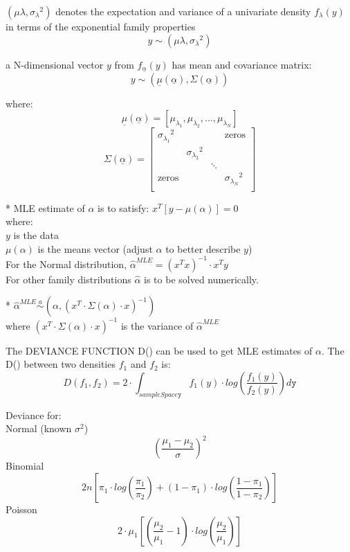 \documentclass[10pt,landscape]{article}
\begin{document}
\begin{multicols}{3}
$(\mu \lambda, {\sigma_\lambda}^2)$ denotes the expectation and variance of a univariate density $f_\lambda (y)$ in terms of the exponential family properties $$ y \sim (\mu \lambda, {\sigma_\lambda}^2) $$

\medskip
a N-dimensional vector $y$ from $f_{\underline{\alpha}} (y)$ has mean and covariance matrix: $$ y \sim (\underline{\mu} (\underline{\alpha}), \Sigma (\underline{\alpha})) $$

where:
$$ \underline{\mu} (\underline{\alpha}) = [\mu_{\lambda_1}, \mu_{\lambda_2}, \hdots, \mu_{\lambda_N}] $$
$$ \Sigma (\underline{\alpha}) = \begin{bmatrix}
 {\sigma_{\lambda_1}}^2 &  &  & \text{zeros} \\
   & {\sigma_{\lambda_2}}^2 &  &  \\
   &  & \ddots &  \\
 \text{zeros} &  &  & {\sigma_{\lambda_N}}^2 \\
\end{bmatrix} $$

\medskip
* MLE estimate of $\alpha$ is to satisfy: $x^T [y - \mu (\alpha)] = 0$ \\
where: \\
$y$ is the data \\
$\mu (\alpha)$ is the means vector (adjust $\alpha$ to better describe $y$) \\
For the Normal distribution, ${\hat{\alpha}}^{MLE} = (x^T x)^{-1} \cdot x^T y$ \\
For other family distributions $\hat{\alpha}$ is to be solved numerically.

\medskip
* ${\hat{\alpha}}^{MLE} \stackrel{a}{\sim} (\alpha, (x^T \cdot \Sigma (\alpha) \cdot x)^{-1})$ \\
where $(x^T \cdot \Sigma (\alpha) \cdot x)^{-1} $ is the variance of ${\hat{\alpha}}^{MLE}$

\medskip
The DEVIANCE FUNCTION D() can be used to get MLE estimates of $\alpha$. The D() between two densities $f_1$ and $f_2$ is: $$ D(f_1, f_2) = 2 \cdot \int_{sampleSpace\mathtt{y}} f_1 (y) \cdot log \left( \frac{f_1 (y)}{f_2 (y)} \right) d\mathtt{y} $$

\medskip
Deviance for: \\
Normal (known $\sigma^2$) $$ \left( \frac{\mu_1 - \mu_2}{\sigma} \right)^2 $$
Binomial $$ 2 n \left[ \pi_1 \cdot log \left( \frac{\pi_1}{\pi_2} \right) + (1 - \pi_1) \cdot log \left( \frac{1 - \pi_1}{1 - \pi_2} \right) \right] $$
Poisson $$ 2 \cdot \mu_1 \left[ \left(\frac{\mu_2}{\mu_1} - 1\right) \cdot log \left(\frac{\mu_2}{\mu_1}\right) \right] $$


\end{multicols}
\end{document}
